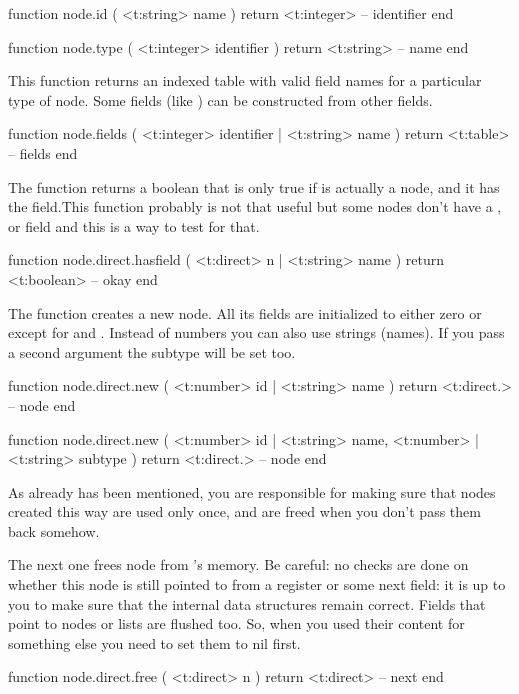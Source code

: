 \starttyping[option=LUA]
function node.id ( <t:string> name )
    return <t:integer> -- identifier
end

function node.type ( <t:integer> identifier )
    return <t:string> -- name
end
\stoptyping

This function returns an indexed table with valid field names for a particular
type of node. Some fields (like ) can be constructed from other
fields.

\starttyping[option=LUA]
function node.fields ( <t:integer> identifier | <t:string> name )
    return <t:table> -- fields
end
\stoptyping

The  function returns a boolean that is only true if  is
actually a node, and it has the field.This function probably is not that useful
but some nodes don't have a ,  or  field
and this is a way to test for that.

\starttyping[option=LUA]
function node.direct.hasfield ( <t:direct> n | <t:string> name )
    return <t:boolean> -- okay
end
\stoptyping

The  function creates a new node. All its fields are initialized to
either zero or  except for  and . Instead of
numbers you can also use strings (names). If you pass a second argument the
subtype will be set too.

\starttyping[option=LUA]
function node.direct.new (
    <t:number> id | <t:string> name
)
    return <t:direct.> -- node
end

function node.direct.new (
    <t:number> id | <t:string> name,
    <t:number> | <t:string> subtype
)
    return <t:direct.> -- node
end
\stoptyping

As already has been mentioned, you are responsible for making sure that nodes
created this way are used only once, and are freed when you don't pass them
back somehow.

The next one frees node  from \TEX's memory. Be careful: no checks are
done on whether this node is still pointed to from a register or some \type
{next} field: it is up to you to make sure that the internal data structures
remain correct. Fields that point to nodes or lists are flushed too. So, when
you used their content for something else you need to set them to nil first.

\starttyping[option=LUA]
function node.direct.free ( <t:direct> n )
    return <t:direct> -- next
end
\stoptyping

